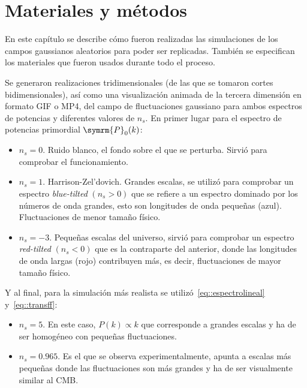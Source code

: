 \chapter{Materiales y métodos}\label{ch::mym}
En este capítulo se describe cómo fueron realizadas las simulaciones de los campos gaussianos aleatorios para poder ser replicadas. También se especifican los materiales que fueron usados durante todo el proceso.

Se generaron realizaciones tridimensionales (de las que se tomaron cortes bidimensionales), así como una visualización animada de la tercera dimensión en formato GIF o MP4, del campo de fluctuaciones gaussiano para ambos espectros de potencias y diferentes valores de \(n_s\). En primer lugar para el espectro de potencias primordial \(\symrm{P}_0(k)\):
\begin{itemize}
    \item \(n_s=0\). Ruido blanco, el fondo sobre el que se perturba. Sirvió para comprobar el funcionamiento.
    \item \(n_s=1\). Harrison-Zel'dovich. Grandes escalas, se utilizó para comprobar un espectro \textit{blue-tilted} \((n_s>0)\) que se refiere a un espectro dominado por los números de onda grandes, esto son longitudes de onda pequeñas (azul). Fluctuaciones de menor tamaño físico.
    \item \(n_s=-3\). Pequeñas escalas del universo, sirvió para comprobar un espectro \textit{red-tilted} \((n_s<0)\) que es la contraparte del anterior, donde las longitudes de onda largas (rojo) contribuyen más, es decir, fluctuaciones de mayor tamaño físico.
\end{itemize}
Y al final, para la simulación más realista se utilizó~\eqref{eq::espectrolineal} y~\eqref{eq::transff}:
\begin{itemize}
    \item \(n_s=5\). En este caso, \(P(k)\propto k\) que corresponde a grandes escalas y ha de ser homogéneo con pequeñas fluctuaciones.
    \item \(n_s=0.965\). Es el que se observa experimentalmente, apunta a escalas más pequeñas donde las fluctuaciones son más grandes y ha de ser visualmente similar al CMB.
\end{itemize}

